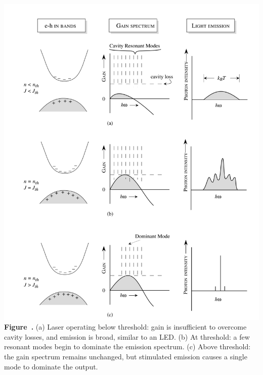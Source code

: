 \begin{center}
	\begin{minipage}{0.90\textwidth}
		\centering
		\includegraphics[width=\textwidth]{img/Laser_Threshold.png}
		\\[0.5em]
		\textbf{Figure~\thefigure.} (a) Laser operating below threshold: gain is insufficient to overcome cavity losses, and emission is broad, similar to an LED.
		(b) At threshold: a few resonant modes begin to dominate the emission spectrum.
		(c) Above threshold: the gain spectrum remains unchanged, but stimulated emission causes a single mode to dominate the output.
		\label{fig:Laser_threshold}
	\end{minipage}
\end{center}
